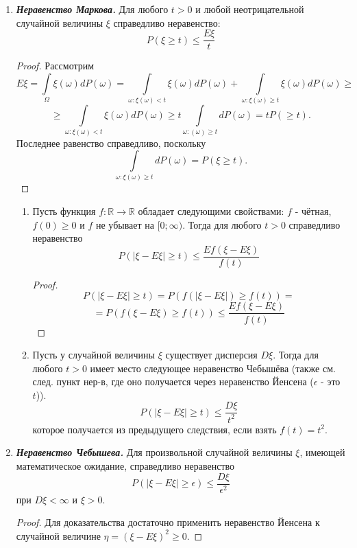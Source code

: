 \begin{enumerate}
	\item \textit{\textbf{Неравенство Маркова.}} Для любого $t > 0$ и любой неотрицательной случайной величины $\xi$ справедливо неравенство:
	\[ P(\xi \ge t) \le \frac{E\xi}{t} \]
	\begin{proof}
		Рассмотрим
		\[ E\xi = \int\limits_{\Omega} \xi (\omega) d P(\omega) = \int\limits_{\omega : \xi (\omega) < t} \xi (\omega) d P(\omega) + \int\limits_{\omega : \xi (\omega) \ge t} \xi (\omega) d P(\omega) \ge \]
		\[ \ge \int\limits_{\omega : \xi (\omega) < t} \xi (\omega) d P(\omega) \ge t \int\limits_{\omega : (\omega) \ge t} d P (\omega) = t P(\ge t). \]
		Последнее равенство справедливо, поскольку
		\[ \int\limits_{\omega : \xi (\omega) \ge t} d P(\omega) = P (\xi \ge t). \]
	\end{proof}
	\begin{corollary}\leavevmode \vspace*{-\bigskipamount}\vspace*{-\medskipamount}
		\begin{enumerate}
			\item Пусть функция $f : \mathbb{R} \to \mathbb{R}$ обладает следующими свойствами: $f$ - чётная, $f(0) \ge 0$ и $f$ не убывает на $[0; \infty)$. Тогда для любого $t > 0$ справедливо неравенство
			\[ P ( |\xi - E\xi| \ge t ) \le \frac{E f(\xi - E \xi)}{f(t)} \]
			\begin{proof}
				\[ P ( |\xi - E \xi| \ge t ) = P ( f ( |\xi - E\xi| ) \ge f(t) ) = \]
				\[ = P ( f (\xi - E\xi) \ge f(t) ) \le \frac{Ef(\xi - E\xi)}{f(t)} \]
			\end{proof}
			\item Пусть у случайной величины $\xi$ существует дисперсия $D\xi$. Тогда для любого $t>0$ имеет место следующее неравенство Чебышёва (также см. след. пункт нер-в, где оно получается через неравенство Йенсена ($\epsilon$ - это $t$)).
			\[ P ( |\xi - E\xi| \ge t ) \le \frac{D\xi}{t^2} \]
			которое получается из предыдущего следствия, если взять $f(t) = t^2$.
		\end{enumerate}
	\end{corollary}
	\item \textit{\textbf{Неравенство Чебышева.}} Для произвольной случайной величины $\xi$, имеющей математическое ожидание, справедливо неравенство
	\[ P( |\xi - E\xi| \ge \epsilon ) \le \frac{D\xi}{\epsilon^2} \]
	при $D\xi < \infty$ и $\xi > 0$.
	
	\begin{proof}
		Для доказательства достаточно применить неравенство Йенсена к случайной величине $\eta = (\xi - E\xi)^2 \ge 0$.
	\end{proof}
	

\end{enumerate}
